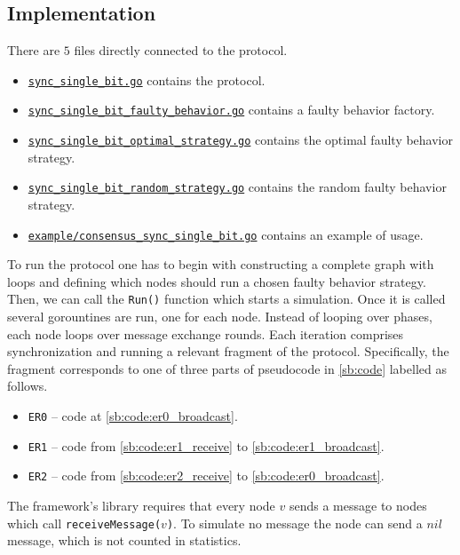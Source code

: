 \subsection{Implementation}
There are $5$ files directly connected to the protocol.
\begin{itemize}
    \item \href{https://github.com/krzysztof-turowski/distributed-framework/blob/6ec7e9cb9a870848f127c539d934b9da9c616ed6/consensus/sync_single_bit/sync_single_bit.go}{\texttt{sync\_single\_bit.go}} contains the protocol.
    \item \href{https://github.com/krzysztof-turowski/distributed-framework/blob/6ec7e9cb9a870848f127c539d934b9da9c616ed6/consensus/sync_single_bit/sync_single_bit_faulty_behavior.go}{\texttt{sync\_single\_bit\_faulty\_behavior.go}} contains a faulty behavior factory.
    \item \href{https://github.com/krzysztof-turowski/distributed-framework/blob/6ec7e9cb9a870848f127c539d934b9da9c616ed6/consensus/sync_single_bit/sync_single_bit_optimal_strategy.go}{\texttt{sync\_single\_bit\_optimal\_strategy.go}} contains the optimal faulty behavior strategy. 
    \item \href{https://github.com/krzysztof-turowski/distributed-framework/blob/6ec7e9cb9a870848f127c539d934b9da9c616ed6/consensus/sync_single_bit/sync_single_bit_random_strategy.go}{\texttt{sync\_single\_bit\_random\_strategy.go}} contains the random faulty behavior strategy.
    \item \href{https://github.com/krzysztof-turowski/distributed-framework/blob/6ec7e9cb9a870848f127c539d934b9da9c616ed6/example/consensus_sync_single_bit.go}{\texttt{example/consensus\_sync\_single\_bit.go}} contains an example of usage.
\end{itemize}
To run the protocol one has to begin with constructing a complete graph with loops and defining which nodes should run a chosen faulty behavior strategy. Then, we can call the \texttt{Run()} function which starts a simulation. Once it is called several gorountines are run, one for each node. Instead of looping over phases, each node loops over message exchange rounds. Each iteration comprises synchronization and running a relevant fragment of the protocol. Specifically, the fragment corresponds to one of three parts of pseudocode in \cref{sb:code} labelled as follows.
\begin{itemize}
    \item \texttt{ER0} -- code at \cref{sb:code:er0_broadcast}.
    \item \texttt{ER1} -- code from \cref{sb:code:er1_receive} to \cref{sb:code:er1_broadcast}.
    \item \texttt{ER2} -- code from \cref{sb:code:er2_receive} to \cref{sb:code:er0_broadcast}.
\end{itemize}
The framework's library requires that every node $v$ sends a message to nodes which call \texttt{receiveMessage($v$)}. To simulate no message the node can send a $nil$ message, which is not counted in statistics.
